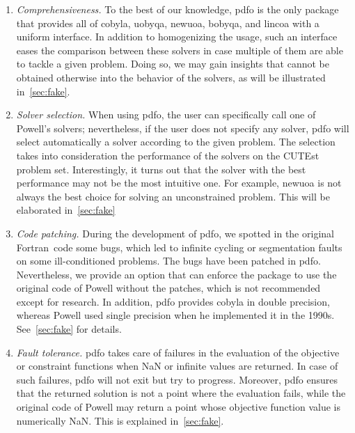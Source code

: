 \documentclass[11pt,draft]{article}
\def\cutest{\mbox{CUTEst}}
\def\fortran{\mbox{Fortran}}
\begin{document}
\begin{enumerate}
    \item \emph{Comprehensiveness.}
    To the best of our knowledge, \gls{pdfo} is the only package that provides all of \gls{cobyla}, \gls{uobyqa}, \gls{newuoa}, \gls{bobyqa}, and \gls{lincoa} with a uniform interface.
    In addition to homogenizing the usage, such an interface eases the comparison between these solvers in case multiple of them are able to tackle a given problem.
    Doing so, we may gain insights that cannot be obtained otherwise into the behavior of the solvers, as will be illustrated in~\cref{sec:fake}.

    \item \emph{Solver selection.}
    When using \gls{pdfo}, the user can specifically call one of Powell's solvers; nevertheless, if the user does not specify any solver, \gls{pdfo} will select automatically a solver according to the given problem.
    The selection takes into consideration the performance of the solvers on the \cutest~\cite{Gould_Orban_Toint_2015} problem set.
    Interestingly, it turns out that the solver with the best performance may not be the most intuitive one.
    For example, \gls{newuoa} is not always the best choice for solving an unconstrained problem.
    This will be elaborated in~\cref{sec:fake}

    \item \emph{Code patching.}
    During the development of \gls{pdfo}, we spotted in the original \fortran\ code some bugs, which led to infinite cycling or segmentation faults on some ill-conditioned problems.
    The bugs have been patched in \gls{pdfo}.
    Nevertheless, we provide an option that can enforce the package to use the original code of Powell without the patches, which is not recommended except for research.
    In addition, \gls{pdfo} provides \gls{cobyla} in double precision, whereas Powell used single precision when he implemented it in the 1990s. See~\cref{sec:fake} for details.

    \item \emph{Fault tolerance.}
    \Gls{pdfo} takes care of failures in the evaluation of the objective or constraint functions when NaN or infinite values are returned.
    In case of such failures, \gls{pdfo} will not exit but try to progress.
    Moreover, \gls{pdfo} ensures that the returned solution is not a point where the evaluation fails, while the original code of Powell may return a point whose objective function value is numerically NaN. This is explained in~\cref{sec:fake}.


\end{enumerate}
\end{document}
